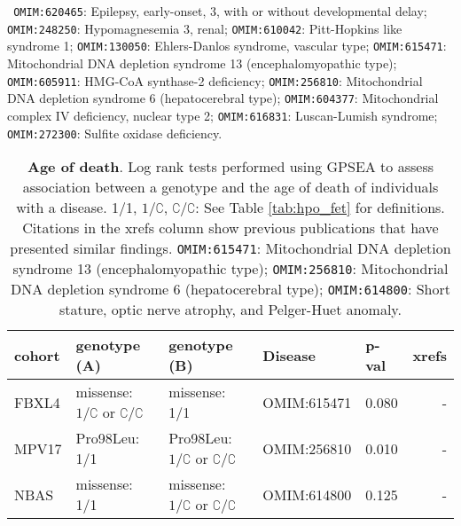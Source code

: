 \begin{table}
{   \texttt{ OMIM:620465}: Epilepsy, early-onset, 3, with or without developmental delay; 
   \texttt{OMIM:248250}: Hypomagnesemia 3, renal;
   \texttt{OMIM:610042}: Pitt-Hopkins like syndrome 1;
   \texttt{OMIM:130050}: Ehlers-Danlos syndrome, vascular type;
   \texttt{OMIM:615471}: Mitochondrial DNA depletion syndrome 13 (encephalomyopathic type);
   \texttt{OMIM:605911}:  HMG-CoA synthase-2 deficiency;
   \texttt{OMIM:256810}: Mitochondrial DNA depletion syndrome 6 (hepatocerebral type);
   \texttt{OMIM:604377}: Mitochondrial complex IV deficiency, nuclear type 2;
   \texttt{OMIM:616831}: Luscan-Lumish syndrome;
  \texttt{OMIM:272300}: Sulfite oxidase deficiency.
}
\label{tab:disease_onset}
\end{table}

\clearpage
\newpage


\begin{table}
\centering
\begin{tabular}{lp{3.5cm}p{3.5cm}>{\raggedright\arraybackslash}p{3cm}lr}
\toprule
\textbf{cohort} & \textbf{genotype (A)} & \textbf{genotype (B)} & \textbf{Disease} & \textbf{p-val} & \textbf{xrefs}\\
\midrule
FBXL4 & missense: $1/\complement$ or $\complement/\complement$& missense: 1/1 & OMIM:615471 & 0.080 & -\\
MPV17 & Pro98Leu: 1/1 & Pro98Leu: $1/\complement$ or $\complement/\complement$ & OMIM:256810 & 0.010 & -\\
NBAS & missense: 1/1 & missense: $1/\complement$ or $\complement/\complement$ & OMIM:614800 & 0.125 & -\\
\bottomrule
\end{tabular}
\caption{\textbf{Age of death}. Log rank tests performed using GPSEA to assess association between a genotype and the age of
    death of individuals with a disease. 1/1, $1/\complement$, $\complement/\complement$: See Table \ref{tab:hpo_fet} for definitions.
    Citations in the xrefs column show previous publications that have presented similar findings.
\texttt{OMIM:615471}: Mitochondrial DNA depletion syndrome 13 (encephalomyopathic type);
\texttt{OMIM:256810}: Mitochondrial DNA depletion syndrome 6 (hepatocerebral type);
\texttt{OMIM:614800}: Short stature, optic nerve atrophy, and Pelger-Huet anomaly.
}
\label{tab:mortality}
\end{table}
\clearpage
\newpage

